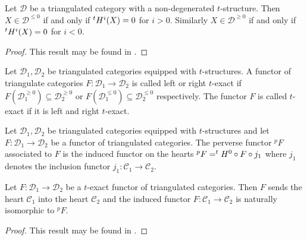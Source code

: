 \begin{proposition}\label{prop: tStructCohomD}
  Let $\mathcal{D}$ be a triangulated category with a non-degenerated $t$-structure.
  Then $X\in \mathcal{D}^{\leq 0}$ if and only if $^tH^i(X) = 0$ for $i>0$. Similarly $X\in \mathcal{D}^{\geq 0}$ if and only if $^tH^i(X)= 0$ for $i<0$.
\end{proposition}
\begin{proof}
  This result may be found in \cite[Chapter 5]{dimca2004sheaves}.
\end{proof}
\begin{definition}
 Let $\mathcal{D}_1,\mathcal{D}_2$ be triangulated categories equipped with $t$-structures. A functor of triangulate categories $F:\mathcal{D}_1\to \mathcal{D}_2$ is called left or right $t$-exact if $F(\mathcal{D}_1^{\geq 0}) \subseteq \mathcal{D}_2^{\geq 0}$ or $F(\mathcal{D}_1^{\leq 0}) \subseteq \mathcal{D}_2^{\leq 0}$ respectively.
 The functor $F$ is called $t$-exact if it is left and right $t$-exact.
\end{definition}
\begin{definition}
 Let $\mathcal{D}_1,\mathcal{D}_2$ be triangulated categories equipped with $t$-structures and let $F:\mathcal{D}_1 \to \mathcal{D}_2$ be a functor of triangulated categories.
 The perverse functor $^pF$ associated to $F$ is the induced functor on the hearts $^pF = ^tH^0 \circ F \circ j_1$ where $j_1$ denotes the inclusion functor $j_1:\mathcal{C}_1\to \mathcal{C}_2$.
\end{definition}
\begin{proposition}\label{prop: FunctorHeart}
  Let $F:\mathcal{D}_1 \to \mathcal{D}_2$ be a $t$-exact functor of triangulated categories. Then $F$ sends the heart $\mathcal{C}_1$ into the heart $\mathcal{C}_2$ and the induced functor $F:\mathcal{C}_1 \to \mathcal{C}_2$ is naturally isomorphic to $^pF$.
\end{proposition}
\begin{proof}
  This result may be found in \cite[Chapter 5]{dimca2004sheaves}.
\end{proof}
